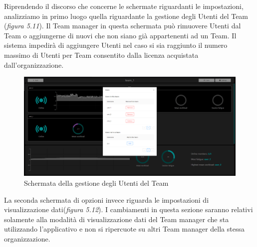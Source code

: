 \noindent Riprendendo il discorso che concerne le schermate riguardanti le impostazioni, analizziamo in primo luogo quella riguardante la gestione degli Utenti del Team (\emph{figura 5.11}).\newline
Il Team manager in questa schermata può rimuovere Utenti dal Team o aggiungerne di nuovi che non siano già appartenenti ad un Team.\newline
Il sistema impedirà di aggiungere Utenti nel caso si sia raggiunto il numero massimo di Utenti per Team consentito dalla licenza acquistata dall'organizzazione.
\vspace{5mm}
\begin{figure}[H]
    \centering
    \includegraphics[width=1.0\textwidth]{img/dashboard_team_users_screenshot.png}
    \caption{Schermata della gestione degli Utenti del Team}
\end{figure}
\vspace{5mm}
\noindent La seconda schermata di opzioni invece riguarda le impostazioni di visualizzazione dati(\emph{figura 5.12}).\newline
I cambiamenti in questa sezione saranno relativi solamente alla modalità di visualizzazione dati del Team manager che sta utilizzando l'applicativo e non si ripercuote su altri Team manager della stessa organizzazione.\newline

